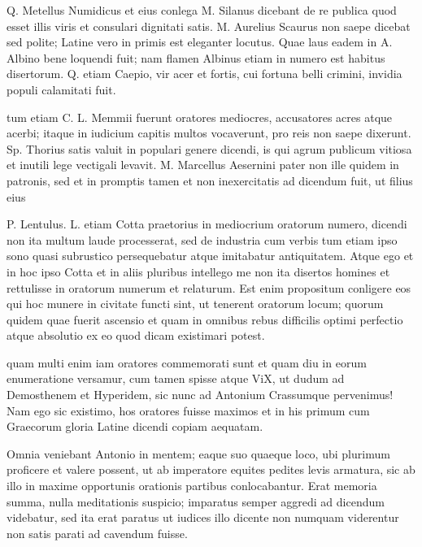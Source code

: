  Q. Metellus Numidicus et eius conlega M. Silanus dicebant de re publica quod esset illis viris et consulari dignitati satis. M. Aurelius Scaurus non saepe dicebat sed polite; Latine vero in primis est eleganter locutus. Quae laus eadem in A. Albino bene loquendi fuit; nam flamen Albinus etiam in numero est habitus disertorum. Q. etiam Caepio, vir acer et fortis, cui fortuna belli crimini, invidia populi calamitati fuit.

 tum etiam C. L. Memmii fuerunt oratores mediocres, accusatores acres atque acerbi; itaque in iudicium capitis multos vocaverunt, pro reis non saepe dixerunt. Sp. Thorius satis valuit in populari genere dicendi, is qui agrum publicum vitiosa et inutili lege vectigali levavit. M. Marcellus Aesernini pater non ille quidem in patronis, sed et in promptis tamen et non inexercitatis ad dicendum fuit, ut filius eius

 P. Lentulus. L. etiam Cotta praetorius in mediocrium oratorum numero, dicendi non ita multum laude processerat, sed de industria cum verbis tum etiam ipso sono quasi subrustico persequebatur atque imitabatur antiquitatem. Atque ego et in hoc ipso Cotta et in aliis pluribus intellego me non ita disertos homines et rettulisse in oratorum numerum et relaturum. Est enim propositum conligere eos qui hoc munere in civitate functi sint, ut tenerent oratorum locum; quorum quidem quae fuerit ascensio et quam in omnibus rebus difficilis optimi perfectio atque absolutio ex eo quod dicam existimari potest.

 quam multi enim iam oratores commemorati sunt et quam diu in eorum enumeratione versamur, cum tamen spisse atque ViX, ut dudum ad Demosthenem et Hyperidem, sic nunc ad Antonium Crassumque pervenimus! Nam ego sic existimo, hos oratores fuisse maximos et in his primum cum Graecorum gloria Latine dicendi copiam aequatam.

 Omnia veniebant Antonio in mentem; eaque suo quaeque loco, ubi plurimum proficere et valere possent, ut ab imperatore equites pedites levis armatura, sic ab illo in maxime opportunis orationis partibus conlocabantur. Erat memoria summa, nulla meditationis suspicio; imparatus semper aggredi ad dicendum videbatur, sed ita erat paratus ut iudices illo dicente non numquam viderentur non satis parati ad cavendum fuisse.

